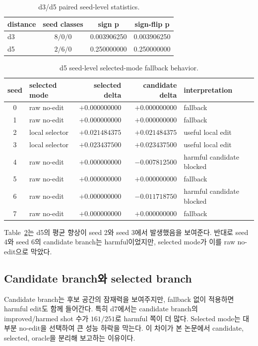 \documentclass[aps,prd,12pt,twocolumn,superscriptaddress,showkeys,floatfix]{revtex4-2}
\begin{document}
\begin{table}[t]
\caption{d3/d5 paired seed-level statistics.}
\label{tab:paired-stats}
\centering
\begin{tabular}{lccc}
\toprule
distance & seed classes & sign p & sign-flip p \\
\midrule
d3 & \(8/0/0\) & 0.003906250 & 0.003906250 \\
d5 & \(2/6/0\) & 0.250000000 & 0.250000000 \\
\bottomrule
\end{tabular}
\end{table}

\begin{table}[t]
\caption{d5 seed-level selected-mode fallback behavior.}
\label{tab:d5-fallback}
\centering
\small
\begin{tabular}{clrrl}
\toprule
seed & selected mode & selected delta & candidate delta & interpretation \\
\midrule
0 & raw no-edit & \(+0.000000000\) & \(+0.000000000\) & fallback \\
1 & raw no-edit & \(+0.000000000\) & \(+0.000000000\) & fallback \\
2 & local selector & \(+0.021484375\) & \(+0.021484375\) & useful local edit \\
3 & local selector & \(+0.023437500\) & \(+0.023437500\) & useful local edit \\
4 & raw no-edit & \(+0.000000000\) & \(-0.007812500\) & harmful candidate blocked \\
5 & raw no-edit & \(+0.000000000\) & \(+0.000000000\) & fallback \\
6 & raw no-edit & \(+0.000000000\) & \(-0.011718750\) & harmful candidate blocked \\
7 & raw no-edit & \(+0.000000000\) & \(+0.000000000\) & fallback \\
\bottomrule
\end{tabular}
\end{table}

Table~\ref{tab:d5-fallback}는 d5의 평균 향상이 seed 2와 seed 3에서 발생했음을
보여준다. 반대로 seed 4와 seed 6의 candidate branch는 harmful이었지만,
selected mode가 이를 raw no-edit으로 막았다.

\subsection{Candidate branch와 selected branch}

Candidate branch는 후보 공간의 잠재력을 보여주지만, fallback 없이 적용하면
harmful edit도 함께 들어간다. 특히 d7에서는 candidate branch의 improved/harmed
shot 수가 \(161/251\)로 harmful 쪽이 더 많다. Selected mode는 대부분 no-edit을
선택하여 큰 성능 하락을 막는다. 이 차이가 본 논문에서 candidate, selected,
oracle을 분리해 보고하는 이유이다.
\end{document}
